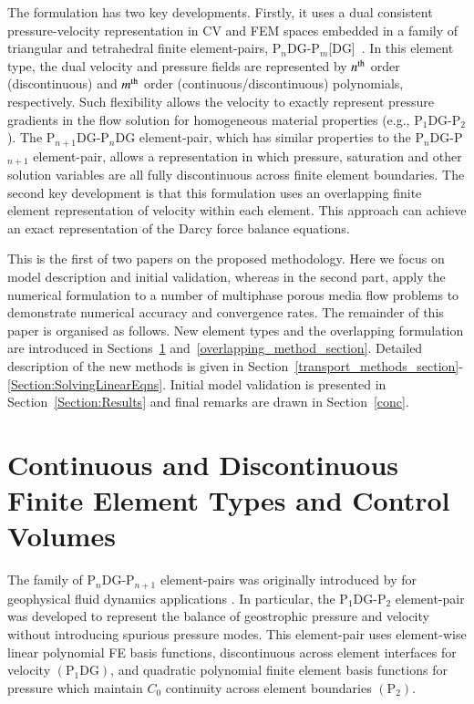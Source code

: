 \documentclass[preprint,authoryear,12pt]{elsarticle}
\newcommand{\PN}[2][error]{P$_{#1}$DG-P$_{#2}$}
\newcommand{\PNDG}[2][error]{P$_{#1}$DG-P$_{#2}$DG}
\begin{document}
The formulation has two key developments. Firstly, it uses a dual consistent pressure-velocity representation in CV and FEM spaces embedded in a family of triangular and tetrahedral finite element-pairs, \PN[n]{m}[DG]~\citep[see][]{cotter_2009b}. In this element type, the dual velocity and pressure fields are represented by $n^{\rm th}$ order (discontinuous) and $m^{\rm th}$ order (continuous/discontinuous) polynomials, respectively. Such flexibility allows the velocity to exactly represent pressure gradients in the flow solution for homogeneous material properties (e.g., \PN[1]{2}). The \PNDG[n+1]{n} element-pair, which has similar properties to the \PN[n]{n+1} element-pair, allows a representation in which pressure, saturation and other solution variables are all fully discontinuous across finite element boundaries. The second key development is that this formulation uses an overlapping finite element representation of velocity within each element. This approach can achieve an exact representation of the Darcy force balance equations. 

\medskip
This is the first of two papers on the proposed methodology. Here we focus on model description and initial validation, whereas in the second part, \citet{pavlidis_2015} apply the numerical formulation to a number of multiphase porous media flow problems to demonstrate numerical accuracy and convergence rates. The remainder of this paper is organised as follows. New element types and the overlapping formulation are introduced in Sections~\ref{element_types_section} and~\ref{overlapping_method_section}.  Detailed description of the new methods is given in Section~\ref{transport_methods_section}-\ref{Section:SolvingLinearEqns}. Initial model validation is presented in Section~\ref{Section:Results} and final remarks are drawn in Section~\ref{conc}.


\section{Continuous and Discontinuous Finite Element Types and Control Volumes} \label{element_types_section}
The family of P$_{n}$DG-P$_{n+1}$ element-pairs was originally introduced by \citet{cotter_2009a} for geophysical fluid dynamics applications \citep[see also][]{cotter_2012}. In particular, the P$_{1}$DG-P$_{2}$ element-pair was developed to represent the balance of geostrophic pressure and velocity without introducing spurious pressure modes. This element-pair uses element-wise linear polynomial FE basis functions, discontinuous across element interfaces for velocity $\left(\text{P}_{1}\text{DG}\right)$, and quadratic polynomial finite element basis functions for pressure which maintain $C_{\text{0}}$ continuity across element boundaries $\left(\text{P}_{2}\right)$. %
\end{document}
